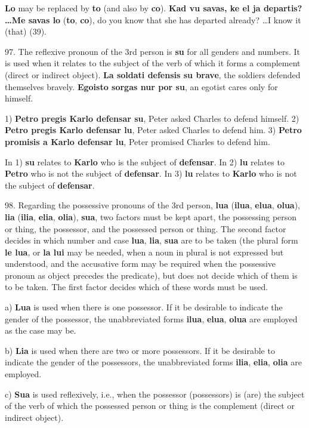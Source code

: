 \textbf{Lo} may be replaced by \textbf{to} (and also by \textbf{co}). \textbf{Kad vu savas, ke el ja departis? \ldots Me savas lo }(\textbf{to}, \textbf{co}), do you know that she has departed already? \ldots I know it (that) (39). 

97. The reflexive pronoun of the 3rd person is \textbf{su} for all genders and numbers. It is used when it relates to the subject of the verb of which it forms a complement (direct or indirect object). \textbf{La soldati defensis su brave}, the soldiers defended themselves bravely. \textbf{Egoisto sorgas nur por su}, an egotist cares only for himself. 

1) \textbf{Petro pregis Karlo defensar su}, Peter asked Charles to defend himself. 
2) \textbf{Petro pregis Karlo defensar lu}, Peter asked Charles to defend him. 
3) \textbf{Petro promisis a Karlo defensar lu}, Peter promised Charles to defend him. 

In 1) \textbf{su} relates to \textbf{Karlo} who is the subject of \textbf{defensar}. In 2) \textbf{lu} relates to \textbf{Petro} who is not the subject of \textbf{defensar}. In 3) \textbf{lu} relates to \textbf{Karlo} who is not the subject of \textbf{defensar}. 

98. Regarding the possessive pronouns of the 3rd person, \textbf{lua} (\textbf{ilua}, \textbf{elua}, \textbf{olua}), \textbf{lia} (\textbf{ilia}, \textbf{elia}, \textbf{olia}), \textbf{sua}, two factors must be kept apart, the possessing person or thing, the possessor, and the possessed person or thing. The second factor decides in which number and case \textbf{lua}, \textbf{lia}, \textbf{sua} are to be taken (the plural form \textbf{le lua}, or \textbf{la lui} may be needed, when a noun in plural is not expressed but understood, and the accusative form may be required when the possessive pronoun as object precedes the predicate), but does not decide which of them is to be taken. The first factor decides which of these words must be used. 

a) \textbf{Lua} is used when there is one possessor. If it be desirable to indicate the gender of the possessor, the unabbreviated forms \textbf{ilua}, \textbf{elua}, \textbf{olua} are employed as the case may be. 

b) \textbf{Lia} is used when there are two or more possessors. If it be desirable to indicate the gender of the possessors, the unabbreviated forms \textbf{ilia}, \textbf{elia}, \textbf{olia} are employed. 

c) \textbf{Sua} is used reflexively, i.e., when the possessor (possessors) is (are) the subject of the verb of which the possessed person or thing is the complement (direct or indirect object). 

